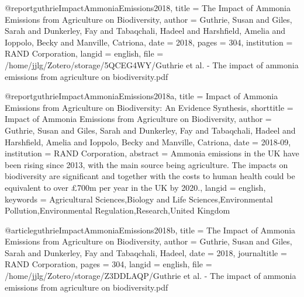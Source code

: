 {{{@report{guthrieImpactAmmoniaEmissions2018,
  title = {The Impact of Ammonia Emissions from Agriculture on Biodiversity},
  author = {Guthrie, Susan and Giles, Sarah and Dunkerley, Fay and Tabaqchali, Hadeel and Harshfield, Amelia and Ioppolo, Becky and Manville, Catriona},
  date = {2018},
  pages = {304},
  institution = {RAND Corporation},
  langid = {english},
  file = {/home/jjlg/Zotero/storage/5QCEG4WY/Guthrie et al. - The impact of ammonia emissions from agriculture on biodiversity.pdf}
}

@report{guthrieImpactAmmoniaEmissions2018a,
  title = {Impact of Ammonia Emissions from Agriculture on Biodiversity: {{An}} Evidence Synthesis},
  shorttitle = {Impact of Ammonia Emissions from Agriculture on Biodiversity},
  author = {Guthrie, Susan and Giles, Sarah and Dunkerley, Fay and Tabaqchali, Hadeel and Harshfield, Amelia and Ioppolo, Becky and Manville, Catriona},
  date = {2018-09},
  institution = {RAND Corporation},
  abstract = {Ammonia emissions in the UK have been rising since 2013, with the main source being agriculture. The impacts on biodiversity are significant and together with the costs to human health could be equivalent to over £700m per year in the UK by 2020.},
  langid = {english},
  keywords = {Agricultural Sciences,Biology and Life Sciences,Environmental Pollution,Environmental Regulation,Research,United Kingdom}
}

@article{guthrieImpactAmmoniaEmissions2018b,
  title = {The Impact of Ammonia Emissions from Agriculture on Biodiversity},
  author = {Guthrie, Susan and Giles, Sarah and Dunkerley, Fay and Tabaqchali, Hadeel},
  date = {2018},
  journaltitle = {RAND Corporation},
  pages = {304},
  langid = {english},
  file = {/home/jjlg/Zotero/storage/Z3DDLAQP/Guthrie et al. - The impact of ammonia emissions from agriculture on biodiversity.pdf}
}

}}}
